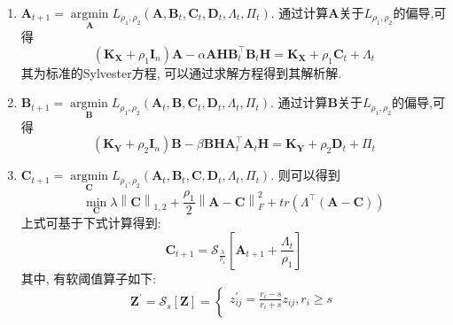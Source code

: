 \documentclass[lang=cn,10pt]{gorgeousnbook}
\numberwithin{equation}{section}%
\numberwithin{figure}{section}%
\begin{document}
\begin{enumerate}[1)]
    \item $\boldsymbol{A}_{t+1}=\mathop {arg\min} \limits_{\bm{A}}L_{\rho _1,\rho _2}\left( \boldsymbol{A},\boldsymbol{B}_t,\boldsymbol{C}_t,\boldsymbol{D}_t,\boldsymbol{\varLambda }_t,\boldsymbol{\varPi }_t \right)$. 通过计算$\bm{A}$关于$L_{\rho _1,\rho _2}$的偏导,可得
    \begin{equation}
        \left( \boldsymbol{K}_{\bm{X}}+\rho _1\boldsymbol{I}_n \right) \boldsymbol{A}-\alpha \boldsymbol{AHB}_{t}^{\top}\boldsymbol{B}_t\boldsymbol{H}=\boldsymbol{K}_{\bm{X}}+\rho _1\boldsymbol{C}_t+\boldsymbol{\varLambda }_t
    \end{equation}
    其为标准的Sylvester方程, 可以通过求解方程得到其解析解. 
    \item $\boldsymbol{B}_{t+1}=\mathop {arg\min} \limits_{\bm{B}}L_{\rho _1,\rho _2}\left( \boldsymbol{A}_t,\boldsymbol{B},\boldsymbol{C}_t,\boldsymbol{D}_t,\boldsymbol{\varLambda }_t,\boldsymbol{\varPi }_t \right)$. 通过计算$\bm{B}$关于$L_{\rho _1,\rho _2}$的偏导,可得
    \begin{equation}
        \left( \boldsymbol{K}_{\bm{Y}}+\rho _2\boldsymbol{I}_n \right) \boldsymbol{B}-\beta \boldsymbol{BHA}_{t}^{\top}\boldsymbol{A}_t\boldsymbol{H}=\boldsymbol{K}_{\bm{Y}}+\rho _2\boldsymbol{D}_t+\boldsymbol{\varPi}_t
    \end{equation}
    \item $\boldsymbol{C}_{t+1}=\mathop {arg\min} \limits_{\bm{C}}L_{\rho _1,\rho _2}\left( \boldsymbol{A}_t,\boldsymbol{B}_t,\boldsymbol{C},\boldsymbol{D}_t,\boldsymbol{\varLambda }_t,\boldsymbol{\varPi }_t \right)$. 则可以得到
    \begin{equation}
        \min_{\boldsymbol{C}} \lambda \left\| \boldsymbol{C} \right\| _{1,2}+\frac{\rho _1}{2}\left\| \boldsymbol{A}-\boldsymbol{C} \right\| _{F}^{2}+tr\left( \boldsymbol{\varLambda }^{\top}\left( \boldsymbol{A}-\boldsymbol{C} \right) \right) 
    \end{equation}
    上式可基于下式计算得到:
	 \begin{equation}
        \boldsymbol{C}_{t+1}=\mathcal{S} _{\frac{\lambda}{\rho _1}}\left[ \boldsymbol{A}_{t+1}+\frac{\boldsymbol{\varLambda }_t}{\rho _1} \right] 
    \end{equation}
    其中, 有软阈值算子如下:
    \begin{equation}
    \boldsymbol{Z}^\prime=\mathcal{S} _s\left[ \boldsymbol{Z} \right] =\begin{cases}
        z_{ij}^{\prime}=\frac{r_i-s}{r_i+s}z_{ij},  r_i\geqslant s\\

\end{cases}
\end{equation}
\end{enumerate}
\end{document}
